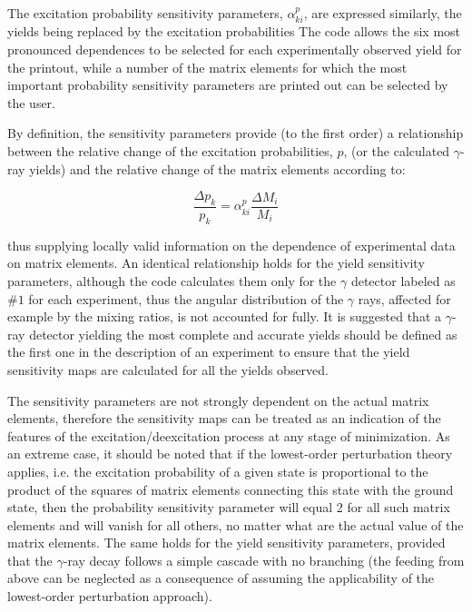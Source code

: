 \documentclass[10pt]{article}
\begin{document}
The excitation probability sensitivity parameters, $\alpha_{k i}^{p}$, are expressed similarly, the yields being replaced by the excitation probabilities The code allows the six most pronounced dependences to be selected for each experimentally observed yield for the printout, while a number of the matrix elements for which the most important probability sensitivity parameters are printed out can be selected by the user.

By definition, the sensitivity parameters provide (to the first order) a relationship between the relative change of the excitation probabilities, $p$, (or the calculated $\gamma$-ray yields) and the relative change of the matrix elements according to:


\begin{equation*}
\frac{\Delta p_{k}}{p_{k}}=\alpha_{k i}^{p} \frac{\Delta M_{i}}{M_{i}} \tag{6.109}
\end{equation*}


thus supplying locally valid information on the dependence of experimental data on matrix elements. An identical relationship holds for the yield sensitivity parameters, although the code calculates them only for the $\gamma$ detector labeled as $\# 1$ for each experiment, thus the angular distribution of the $\gamma$ rays, affected for example by the mixing ratios, is not accounted for fully. It is suggested that a $\gamma$-ray detector yielding the most complete and accurate yields should be defined as the first one in the description of an experiment to ensure that the yield sensitivity maps are calculated for all the yields observed.

The sensitivity parameters are not strongly dependent on the actual matrix elements, therefore the sensitivity maps can be treated as an indication of the features of the excitation/deexcitation process at any stage of minimization. As an extreme case, it should be noted that if the lowest-order perturbation theory applies, i.e. the excitation probability of a given state is proportional to the product of the squares of matrix elements connecting this state with the ground state, then the probability sensitivity parameter will equal 2 for all such matrix elements and will vanish for all others, no matter what are the actual value of the matrix elements. The same holds for the yield sensitivity parameters, provided that the $\gamma$-ray decay follows a simple cascade with no branching (the feeding from above can be neglected as a consequence of assuming the applicability of the lowest-order perturbation approach).
\end{document}
